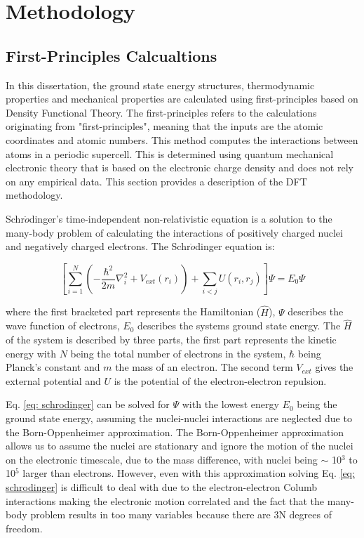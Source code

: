 \chapter{Methodology}

\section{First-Principles Calcualtions}

In this dissertation, the ground state energy structures, thermodynamic properties and mechanical properties are calculated using first-principles based on Density Functional Theory. The first-principles refers to the calculations originating from "first-principles", meaning that the inputs are the atomic coordinates and atomic numbers. This method computes the interactions between atoms in a periodic supercell. This is determined using quantum mechanical electronic theory that is based on the electronic charge density and does not rely on any empirical data. This section provides a description of the DFT methodology.

Schr$\ddot{o}$dinger's time-independent non-relativistic equation is a solution to the many-body problem of calculating the interactions of positively charged nuclei and negatively charged electrons. The Schr$\ddot{o}$dinger equation is:

\begin{equation}
\label{eq: schrodinger}
\left[ \sum_{i=1}^{N} \left( - \frac{\hbar^2}{2m} \nabla_{i}^2 + V_{ext} (r_{i}) \right) + \sum_{i<j} U (r_{i}, r_{j}) \right] \Psi = E_{0} \Psi
\end{equation}

\noindent where the first bracketed part represents the Hamiltonian ($\hat{H}$), $\Psi$ describes the wave function of electrons, $E_{0}$ describes the systems ground state energy. The $\hat{H}$ of the system is described by three parts, the first part represents the kinetic energy with $N$ being the total number of electrons in the system, $\hbar$ being Planck's constant and $m$ the mass of an electron. The second term $V_{ext}$ gives the external potential and $U$ is the potential of the electron-electron repulsion.

Eq. \ref{eq: schrodinger} can be solved for $\Psi$ with the lowest energy $E_0$ being the ground state energy, assuming the nuclei-nuclei interactions are neglected due to the Born-Oppenheimer approximation. The Born-Oppenheimer approximation allows us to assume the nuclei are stationary and ignore the motion of the nuclei on the electronic timescale, due to the mass difference, with nuclei being $\sim$ 10$^3$ to 10$^5$ larger than electrons. However, even with this approximation solving Eq. \ref{eq: schrodinger} is difficult to deal with due to the electron-electron Columb interactions making the electronic motion correlated and the fact that the many-body problem results in too many variables because there are 3N degrees of freedom. 

